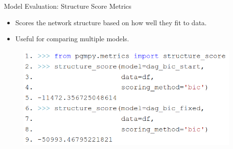 \documentclass{beamer}
\begin{document}
\begin{frame}{Model Evaluation: Structure Score Metrics}
	\begin{itemize}
		\item Scores the network structure based on how well they fit to data.
		\item Useful for comparing multiple models.
	\end{itemize}
	\vspace{1em}
	\begin{figure}
		\includegraphics[scale=0.3]{imgs/structure_score.png}
	\end{figure}
\end{frame}

% 	
% 
% 


% 
\end{document}
